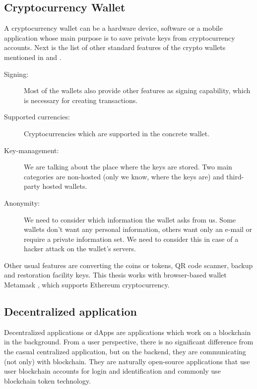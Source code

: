 \documentclass[thesis=M,english]{FITthesis}[2019/12/23]
\begin{document}
%
\subsection{Cryptocurrency Wallet}
A cryptocurrency wallet can be a hardware device, software or a mobile application whose main purpose is to save private keys from cryptocurrency accounts. Next is the list of other standard features of the crypto wallets mentioned in \cite{Suratkar2020928} and \cite{HayNewman11052017}.

 \begin{description}
\item[Signing:]
Most of the wallets also provide other features as signing capability, which is necessary for creating transactions.

\item[Supported currencies:]
Cryptocurrencies which are supported in the concrete wallet.

\item[Key-management:]
We are talking about the place where the keys are stored. Two main categories are non-hosted (only we know, where the keys are) and third-party hosted wallets.

\item[Anonymity:]
We need to consider which information the wallet asks from us. Some wallets don't want any personal information, others want only an e-mail or require a private information set. We need to consider this in case of a hacker attack on the wallet's servers.
\end{description}
Other usual features are converting the coins or tokens, QR code scanner, backup and restoration facility keys.
This thesis works with browser-based wallet Metamask \cite{metamaskWeb}, which supports Ethereum cryptocurrency.

\subsection{Decentralized application}

Decentralized applications or dApps are applications which work on a blockchain in the background. From a user perspective, there is no significant difference from the casual centralized application, but on the backend, they are communicating (not only) with blockchain. They are naturally open-source applications that use user blockchain accounts for login and identification and commonly use blockchain token technology. \cite{dApps}
\end{document}
